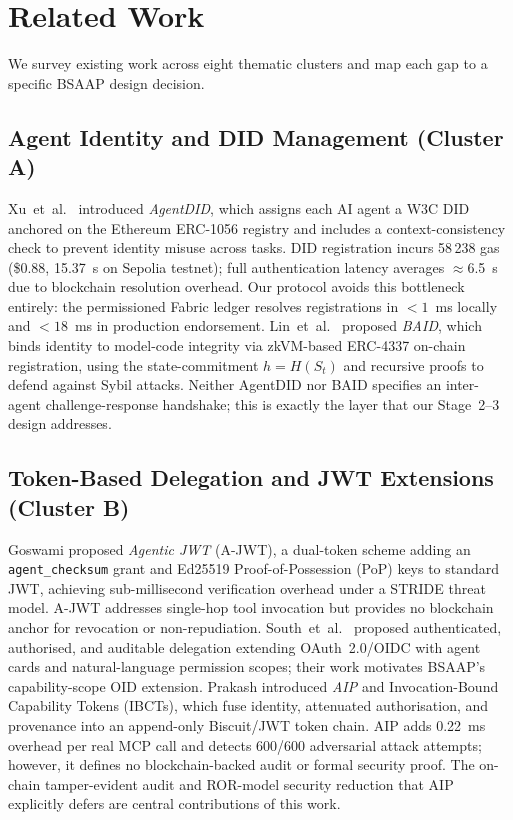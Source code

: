 \documentclass[review,5p,twocolumn,times]{elsarticle}
\begin{document}
\section{Related Work}\label{sec:related}

We survey existing work across eight thematic clusters and map each gap to a
specific BSAAP design decision.

\subsection{Agent Identity and DID Management (Cluster A)}

Xu~et~al.\ \cite{agentdid2026} introduced \emph{AgentDID}, which assigns
each AI agent a W3C DID anchored on the Ethereum ERC-1056 registry and
includes a context-consistency check to prevent identity misuse across tasks.
DID registration incurs 58\,238 gas (\$0.88, 15.37~s on Sepolia testnet);
full authentication latency averages $\approx$6.5~s due to blockchain
resolution overhead. Our protocol avoids this bottleneck entirely: the
permissioned Fabric ledger resolves registrations in $<1$~ms locally and
$<18$~ms in production endorsement. Lin~et~al.\ \cite{baid2025} proposed
\emph{BAID}, which binds identity to model-code integrity via zkVM-based
ERC-4337 on-chain registration, using the state-commitment
$h{=}H(S_t)$ and recursive proofs to defend against Sybil attacks. Neither
AgentDID nor BAID specifies an inter-agent challenge-response handshake;
this is exactly the layer that our Stage~2--3 design addresses.

\subsection{Token-Based Delegation and JWT Extensions (Cluster B)}

Goswami \cite{agenticjwt2025} proposed \emph{Agentic JWT} (A-JWT), a
dual-token scheme adding an \texttt{agent\_checksum} grant and Ed25519
Proof-of-Possession (PoP) keys to standard JWT, achieving sub-millisecond
verification overhead under a STRIDE threat model. A-JWT addresses single-hop
tool invocation but provides no blockchain anchor for revocation or
non-repudiation. South~et~al.\ \cite{stanford2025a2a} proposed
authenticated, authorised, and auditable delegation extending OAuth~2.0/OIDC
with agent cards and natural-language permission scopes; their work motivates
BSAAP's capability-scope OID extension.
Prakash \cite{aip2026} introduced \emph{AIP} and
Invocation-Bound Capability Tokens (IBCTs), which fuse identity, attenuated
authorisation, and provenance into an append-only Biscuit/JWT token chain.
AIP adds 0.22~ms overhead per real MCP call and detects 600/600 adversarial
attack attempts; however, it defines no blockchain-backed audit or formal
security proof. The on-chain tamper-evident audit and ROR-model security
reduction that AIP explicitly defers are central contributions of this work.
\end{document}
